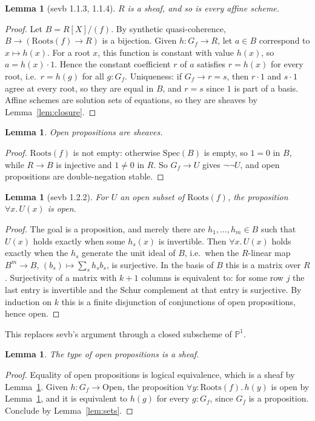 \documentclass[11pt]{amsart}
\newtheorem{lemma}[theorem]{Lemma}
\theoremstyle{definition}
\theoremstyle{remark}
\newcommand{\Roots}{\mathrm{Roots}}
\begin{document}
\begin{lemma}[sevb 1.1.3, 1.1.4]\label{lem:Rsheaf}
$R$ is a sheaf, and so is every affine scheme.
\end{lemma}
\begin{proof}
Let $B=R[X]/(f)$. By synthetic quasi-coherence, $B\to(\Roots(f)\to R)$ is a
bijection. Given $h:G_f\to R$, let $a\in B$ correspond to $x\mapsto h(x)$.
For a root $x$, this function is constant with value $h(x)$, so $a=h(x)\cdot1$.
Hence the constant coefficient $r$ of $a$ satisfies $r=h(x)$ for every
root, i.e.\ $r=h(g)$ for all $g:G_f$. Uniqueness: if $G_f\to r=s$, then
$r\cdot1$ and $s\cdot1$ agree at every root, so they are equal in $B$, and
$r=s$ since $1$ is part of a basis. Affine schemes are solution sets of
equations, so they are sheaves by Lemma~\ref{lem:closure}.
\end{proof}

\begin{lemma}\label{lem:opens}
Open propositions are sheaves.
\end{lemma}
\begin{proof}
$\Roots(f)$ is not empty: otherwise $\mathrm{Spec}(B)$ is empty, so $1=0$ in
$B$, while $R\to B$ is injective and $1\neq0$ in $R$. So $G_f\to U$ gives
$\neg\neg U$, and open propositions are double-negation stable.
\end{proof}

\begin{lemma}[sevb 1.2.2]\label{lem:compact}
For $U$ an open subset of $\Roots(f)$, the proposition $\forall
x.\,U(x)$ is open.
\end{lemma}
\begin{proof}
The goal is a proposition, and merely there are $h_1,\dots,h_m\in B$ such
that $U(x)$ holds exactly when some $h_s(x)$ is invertible. Then $\forall x.\,U(x)$ holds exactly when the
$h_s$ generate the unit ideal of $B$, i.e.\ when the $R$-linear map
$B^m\to B$, $(b_s)\mapsto\sum_sh_sb_s$, is surjective. In the basis of $B$
this is a matrix over $R$. Surjectivity of a matrix with $k+1$ columns is
equivalent to: for some row $j$ the last entry is invertible and the Schur
complement at that entry is surjective. By induction on $k$ this is a
finite disjunction of conjunctions of open propositions, hence open.
\end{proof}

This replaces sevb's argument through a closed subscheme of $\mathbb P^1$.

\begin{lemma}\label{lem:opentype}
The type of open propositions is a sheaf.
\end{lemma}
\begin{proof}
Equality of open propositions is logical equivalence, which is a sheaf by
Lemma~\ref{lem:opens}. Given $h:G_f\to\mathrm{Open}$, the proposition
$\forall y:\Roots(f).\,h(y)$ is open by Lemma~\ref{lem:compact}, and it is
equivalent to $h(g)$ for every $g:G_f$, since $G_f$ is a proposition.
Conclude by Lemma~\ref{lem:sets}.
\end{proof}
\end{document}
